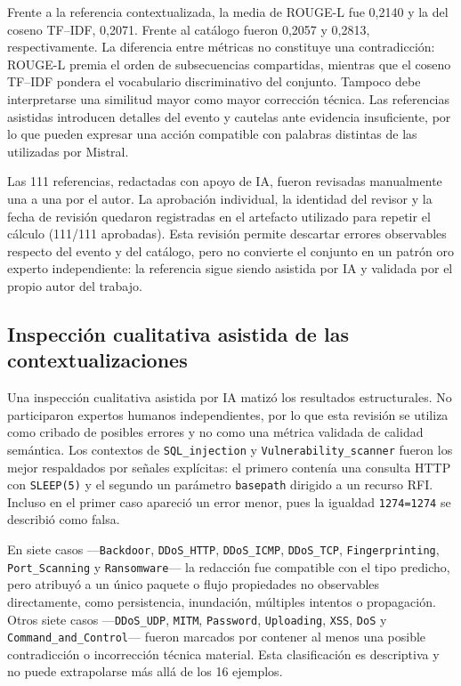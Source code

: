 Frente a la referencia contextualizada, la media de ROUGE-L fue 0,2140 y la
del coseno TF--IDF, 0,2071. Frente al catálogo fueron 0,2057 y 0,2813,
respectivamente. La diferencia entre métricas no constituye una contradicción:
ROUGE-L premia el orden de subsecuencias compartidas, mientras que el coseno
TF--IDF pondera el vocabulario discriminativo del conjunto. Tampoco debe
interpretarse una similitud mayor como mayor corrección técnica. Las
referencias asistidas introducen detalles del evento y cautelas ante evidencia
insuficiente, por lo que pueden expresar una acción compatible con palabras
distintas de las utilizadas por Mistral.

Las 111 referencias, redactadas con apoyo de IA, fueron revisadas manualmente
una a una por el autor. La aprobación individual, la identidad del revisor y la
fecha de revisión quedaron registradas en el artefacto utilizado para repetir
el cálculo (111/111 aprobadas). Esta revisión permite descartar errores
observables respecto del evento y del catálogo, pero no convierte el conjunto
en un patrón oro experto independiente: la referencia sigue siendo asistida
por IA y validada por el propio autor del trabajo.

\subsection*{Inspección cualitativa asistida de las contextualizaciones}

Una inspección cualitativa asistida por IA matizó los resultados estructurales.
No participaron expertos humanos independientes, por lo que esta revisión se
utiliza como cribado de posibles errores y no como una métrica validada de
calidad semántica. Los contextos de \texttt{SQL\_injection} y
\texttt{Vulnerability\_scanner} fueron los mejor respaldados por señales
explícitas: el primero contenía una consulta HTTP con \texttt{SLEEP(5)} y el
segundo un parámetro \texttt{basepath} dirigido a un recurso RFI. Incluso en el
primer caso apareció un error menor, pues la igualdad \texttt{1274=1274} se
describió como falsa.

En siete casos ---\texttt{Backdoor}, \texttt{DDoS\_HTTP},
\texttt{DDoS\_ICMP}, \texttt{DDoS\_TCP}, \texttt{Fingerprinting},
\texttt{Port\_Scanning} y \texttt{Ransomware}--- la redacción fue compatible
con el tipo predicho, pero atribuyó a un único paquete o flujo propiedades no
observables directamente, como persistencia, inundación, múltiples intentos o
propagación. Otros siete casos ---\texttt{DDoS\_UDP}, \texttt{MITM},
\texttt{Password}, \texttt{Uploading}, \texttt{XSS}, \texttt{DoS} y
\texttt{Command\_and\_Control}--- fueron marcados por contener al menos una
posible contradicción o incorrección técnica material. Esta clasificación es
descriptiva y no puede extrapolarse más allá de los 16 ejemplos.

